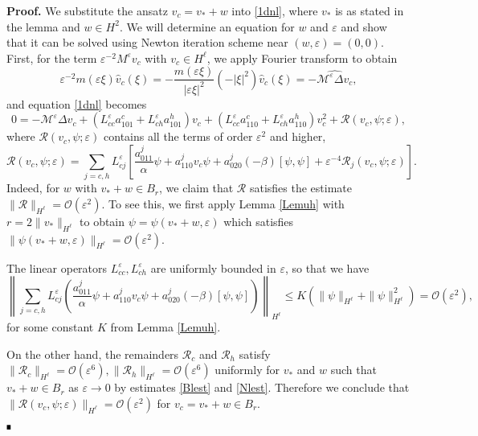 \documentclass[letterpaper,11pt]{article}
\newcommand{\rmO}{\mathcal{O}}
\newcommand{\eps}{\varepsilon}
\newcommand{\Rm}{\mathcal{R}}
\newcommand{\M}{\mathcal{M}}
\numberwithin{equation}{section}
\theoremstyle{plain}
\theoremstyle{remark}
\newenvironment{Proof}[1][.]%
 {\begin{trivlist}\item[]\textbf{Proof#1 }}%
 {\hspace*{\fill}$\rule{0.3\baselineskip}{0.35\baselineskip}$\end{trivlist}}
\begin{document}

\begin{Proof}
We substitute the ansatz $v_c = v_* + w$ into \eqref{1dnl}, where $v_*$ is as stated in the lemma and $w \in H^2$. We will determine an equation for $w$ and $\eps$ and show that it can be solved using Newton iteration scheme near $(w,\eps)=(0,0)$.
First, for the term $\eps^{-2}M^\eps v_c$ with $v_c \in H^\ell$, we apply Fourier transform to obtain
\[
\eps^{-2}m(\eps\xi)\widehat{v}_c(\xi) = -\frac{m(\eps\xi)}{|\eps\xi|^2}(-|\xi|^2)\widehat{v}_c(\xi) = -\widehat{\M^\eps \Delta v_c},
\]
and equation \eqref{1dnl} becomes
\[
0 = -\M^\eps \Delta v_c + \left(L_{cc}^\eps a_{101}^c+L_{ch}^\eps a_{101}^h\right)v_c+\left(L_{cc}^\eps a_{110}^c+L_{ch}^\eps a_{110}^h\right)v_c^2 + \Rm(v_c,\psi;\eps),
\]
where $\Rm(v_c,\psi;\eps)$ contains all the terms of order $\eps^2$ and higher,
\[
\Rm(v_c,\psi;\eps) =\sum_{j=c,h} L_{cj}^\eps\left[ \frac{a_{011}^j}{\alpha}\psi+a_{110}^j v_c\psi+a_{020}^j (-\beta)[\psi,\psi]+\eps^{-4}\Rm_j(v_c,\psi;\eps)\right].
\]
Indeed, for $w$ with $v_*+w \in B_r$, we claim that $\Rm$ satisfies the estimate $\|\Rm\|_{H^\ell} = \rmO(\eps^2)$.  To see this, we first apply Lemma \ref{Lemuh} with $r = 2\|v_*\|_{H^\ell}$ to obtain $\psi = \psi(v_*+w,\eps)$ which satisfies $\|\psi(v_*+w,\eps)\|_{H^\ell} = \rmO(\eps^2)$.

The linear operators $L_{cc}^\eps, L_{ch}^\eps$ are uniformly bounded in $\eps$, so that we have
\[
\left\|\sum_{j=c,h} L_{cj}^\eps\left( \frac{a_{011}^j}{\alpha}\psi+a_{110}^j v_c\psi+a_{020}^j (-\beta)[\psi,\psi]\right)\right\|_{H^\ell} \le K(\|\psi\|_{H^\ell}+\|\psi\|_{H^\ell}^2) = \rmO(\eps^2),
\]
for some constant $K$ from Lemma \ref{Lemuh}.

On the other hand, the remainders $\Rm_c$ and $\Rm_h$ satisfy $\|\Rm_c\|_{H^\ell}= \rmO(\eps^6), \|\Rm_h\|_{H^\ell} = \rmO(\eps^6)$ uniformly for $v_*$ and $w$ such that $v_* +w \in B_r$ as $\eps \to 0$ by  estimates \eqref{Blest} and \eqref{Nlest}. Therefore we conclude that $\|\Rm(v_c,\psi;\eps)\|_{H^\ell} = \rmO(\eps^2)$ for $v_c=v_*+w \in B_r$.
 

\end{Proof}
\end{document}
